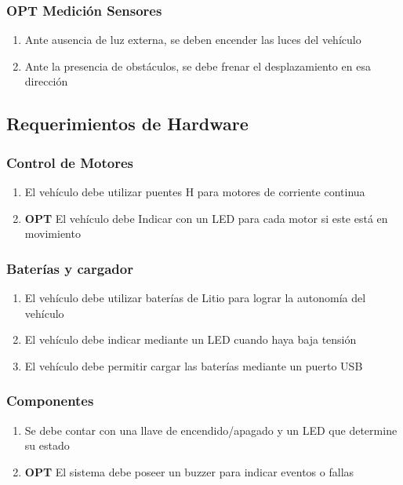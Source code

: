 \subsubsection{\textbf{OPT} Medición Sensores }

\begin{enumerate}
	\item Ante ausencia de luz externa, se deben encender las luces del vehículo
	\item Ante la presencia de obstáculos, se debe frenar el desplazamiento en esa dirección
	
\end{enumerate}

\subsection{Requerimientos de Hardware}

\subsubsection{Control de Motores}

\begin{enumerate}
	\item El vehículo debe utilizar puentes H para motores de corriente continua
	\item \textbf{OPT} El vehículo debe Indicar con un LED para cada motor si este está en movimiento
\end{enumerate}

\subsubsection{Baterías y cargador}

\begin{enumerate}
	\item El vehículo debe utilizar baterías de Litio para lograr la autonomía del vehículo
	\item El vehículo debe indicar mediante un LED cuando haya baja tensión
	\item El vehículo debe permitir cargar las baterías mediante un puerto USB
\end{enumerate}

\subsubsection{Componentes}

\begin{enumerate}
	\item Se debe contar con una llave de encendido/apagado y un LED que determine su estado
	\item \textbf{OPT} El sistema debe poseer un buzzer para indicar eventos o fallas
\end{enumerate}

